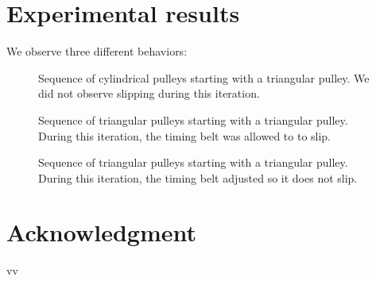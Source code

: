 \documentclass[conference]{IEEEtran}
\begin{document}
\section{Experimental results}

We observe three different behaviors: 

\begin{figure}[htbp]
\caption{Sequence of cylindrical pulleys starting with a triangular pulley. We did not observe slipping during this iteration.}
\label{tri_circ}
\end{figure}

\begin{figure}[htbp]
\caption{Sequence of triangular pulleys starting with a triangular pulley. During this iteration, the timing belt was allowed to to slip.}
\label{tri_tri}
\end{figure}

\begin{figure}[htbp]
\caption{Sequence of triangular pulleys starting with a triangular pulley. During this iteration, the timing belt adjusted so it does not slip.}
\label{tri_tri_FB}
\end{figure}

\section*{Acknowledgment}

\appendix \label{appendix}

vv

\begin{thebibliography}{00}
\end{thebibliography}
 
\end{document}
